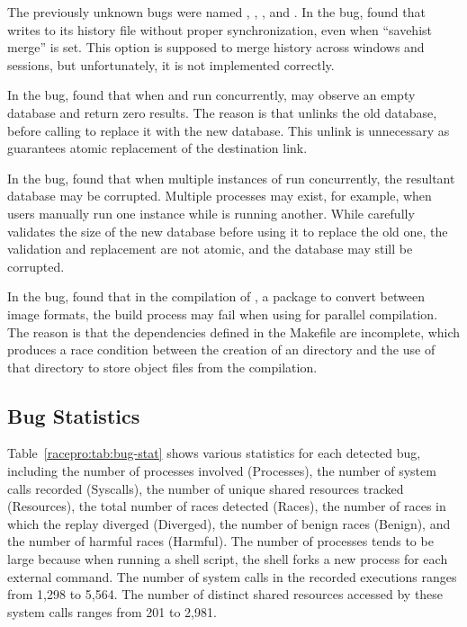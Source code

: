 The \nracepronew previously unknown bugs were named ,
, , and .  In the  bug, \racepro found 
that  writes to its history file without proper
synchronization, even when ``savehist merge'' is set.  This option is
supposed to merge history across windows and sessions, but
unfortunately, it is not implemented correctly. 

In the  bug, \racepro found that when  and 
run concurrently,  may observe an empty database and return
zero results.  The reason is that  unlinks the old database,
before calling  to replace it with the new database.  This
unlink is unnecessary as  guarantees atomic replacement of the
destination link.

In the  bug, \racepro found that when multiple instances of
 run concurrently, the resultant database may be
corrupted. Multiple  processes may exist, for
example, when users manually run one instance while  is
running another.  While  carefully validates the size of
the new database before using it to replace the old one,
the validation and replacement are not atomic, and the database may
still be corrupted.

In the  bug, \racepro found that in the compilation of ,
a package to convert between image formats, the build process may fail
when using  for parallel compilation. The reason is that
the dependencies defined in the Makefile are incomplete,
which produces a race condition between the creation of an 
directory and the use of that directory to store object files from
the compilation.

\subsection{Bug Statistics} \label{racepro:sec:race}

Table~\ref{racepro:tab:bug-stat} shows various statistics for each detected
bug, including the number of processes involved (Processes), the
number of system calls recorded (Syscalls), the number of unique 
shared resources tracked (Resources), the total number of races
detected (Races), the number of races in which the replay diverged
(Diverged), the number of benign races (Benign), and the number of
harmful races (Harmful).  
The number of processes tends to be large because when running a shell
script, the shell forks a new process for each external command.  The
number of system calls in the recorded executions ranges from 1,298 to
5,564. The number of distinct shared resources accessed by these
system calls ranges from 201 to 2,981.

